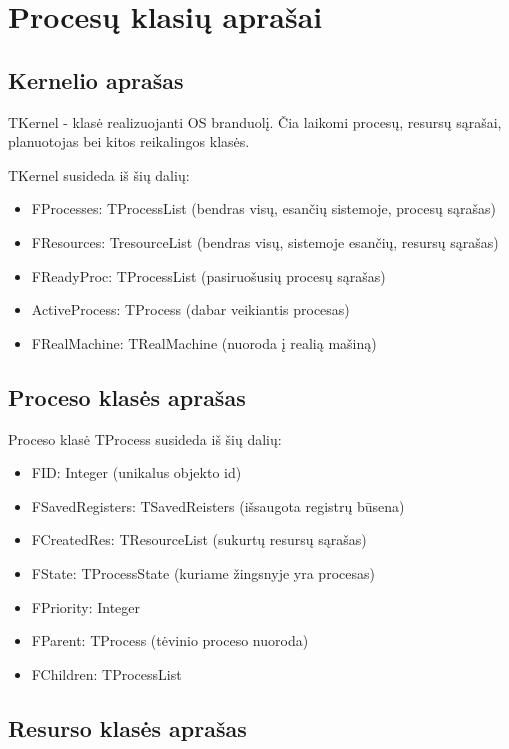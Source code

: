 \documentclass{VUMIFInfKursinis}
\begin{document}
\section{Procesų klasių aprašai}

\subsection{Kernelio aprašas}

TKernel - klasė realizuojanti OS branduolį. Čia laikomi procesų, resursų sąrašai, planuotojas bei kitos reikalingos klasės.

TKernel susideda iš šių dalių:

\begin{itemize}
	\item FProcesses: TProcessList (bendras visų, esančių sistemoje, procesų sąrašas)
	\item FResources: TresourceList (bendras visų, sistemoje esančių, resursų sąrašas)
	\item FReadyProc: TProcessList (pasiruošusių procesų sąrašas)
	\item ActiveProcess: TProcess (dabar veikiantis procesas)
	\item FRealMachine: TRealMachine (nuoroda į realią mašiną)
\end{itemize} 

\subsection{Proceso klasės aprašas}

Proceso klasė TProcess susideda iš šių dalių:

\begin{itemize}
	\item FID: Integer (unikalus objekto id)
	\item FSavedRegisters: TSavedReisters (išsaugota registrų būsena)
	\item FCreatedRes: TResourceList (sukurtų resursų sąrašas)
	\item FState: TProcessState (kuriame žingsnyje yra procesas)
	\item FPriority: Integer
	\item FParent: TProcess (tėvinio proceso nuoroda)
	\item FChildren: TProcessList
\end{itemize}

\subsection{Resurso klasės aprašas}
\end{document}
